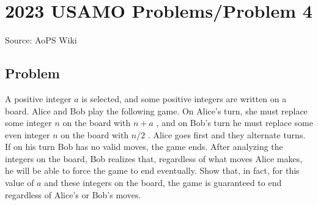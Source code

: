 \documentclass[12pt]{article}
\begin{document}
\section*{{2023 USAMO Problems/Problem 4}}
Source: AoPS Wiki

\subsection*{Problem}
A positive integer $a$ is selected, and some positive integers are written on a board. Alice and Bob play the following game. On Alice's turn, she must replace some integer $n$ on the board with $n+a$ , and on Bob's turn he must replace some even integer $n$ on the board with $n/2$ . Alice goes first and they alternate turns. If on his turn Bob has no valid moves, the game ends. After analyzing the integers on the board, Bob realizes that, regardless of what moves Alice makes, he will be able to force the game to end eventually. Show that, in fact, for this value of $a$ and these integers on the board, the game is guaranteed to end regardless of Alice's or Bob's moves.
\end{document}
